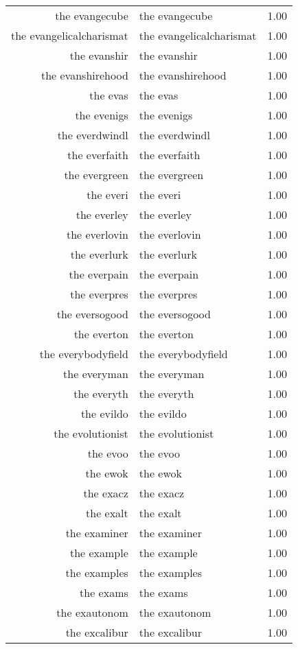 \begin{table}[ht]
\begin{tabular}{rlr}
  the evangecube & the evangecube & 1.00 \\ 
  the evangelicalcharismat & the evangelicalcharismat & 1.00 \\ 
  the evanshir & the evanshir & 1.00 \\ 
  the evanshirehood & the evanshirehood & 1.00 \\ 
  the evas & the evas & 1.00 \\ 
  the evenigs & the evenigs & 1.00 \\ 
  the everdwindl & the everdwindl & 1.00 \\ 
  the everfaith & the everfaith & 1.00 \\ 
  the evergreen & the evergreen & 1.00 \\ 
  the everi & the everi & 1.00 \\ 
  the everley & the everley & 1.00 \\ 
  the everlovin & the everlovin & 1.00 \\ 
  the everlurk & the everlurk & 1.00 \\ 
  the everpain & the everpain & 1.00 \\ 
  the everpres & the everpres & 1.00 \\ 
  the eversogood & the eversogood & 1.00 \\ 
  the everton & the everton & 1.00 \\ 
  the everybodyfield & the everybodyfield & 1.00 \\ 
  the everyman & the everyman & 1.00 \\ 
  the everyth & the everyth & 1.00 \\ 
  the evildo & the evildo & 1.00 \\ 
  the evolutionist & the evolutionist & 1.00 \\ 
  the evoo & the evoo & 1.00 \\ 
  the ewok & the ewok & 1.00 \\ 
  the exacz & the exacz & 1.00 \\ 
  the exalt & the exalt & 1.00 \\ 
  the examiner & the examiner & 1.00 \\ 
  the example & the example & 1.00 \\ 
  the examples & the examples & 1.00 \\ 
  the exams & the exams & 1.00 \\ 
  the exautonom & the exautonom & 1.00 \\ 
  the excalibur & the excalibur & 1.00 \\ 

\end{tabular}
\end{table}
